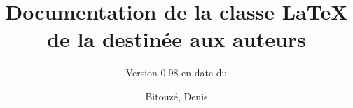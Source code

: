 \documentclass{gztarticle}
\newcommand{\releaseversion}{0.98}
\begin{document}
\title[short=Documentation de la classe de la \emph{Gazette} destinée aux
auteurs]{Documentation de la classe \LaTeX{} de la \gzt*{} destinée aux
  auteurs}
\subtitle[short=Version \releaseversion{}
(\displaydate{release-date})]{\bigskip\Large Version \releaseversion{} en date du
  }%
%
\author[%
affiliation={%
  Université du Littoral Côte d'Opale, Laboratoire de mathématiques pures et
  appliquées%
},%
photo=denis,%
email=denis.bitouze@lmpa.univ-littoral.fr,%
webpage=http://gte.univ-littoral.fr/members/dbitouze/pub/latex/,%
]{Bitouzé, Denis}
%
\maketitle*
%
\localtableofcontents
%




%
\printindex
%
\printbibliography
\end{document}
